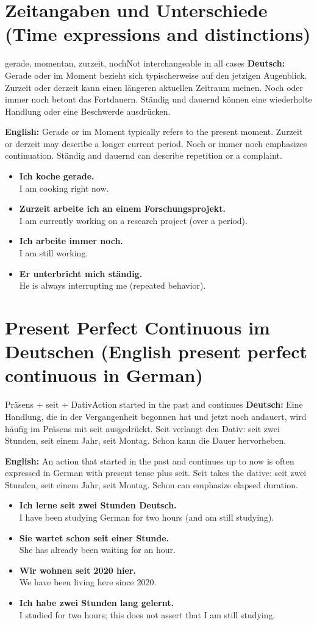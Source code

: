 \documentclass[a4paper,11pt]{article}
\newcommand{\GermanText}[1]{\textbf{Deutsch: }#1\par}
\newcommand{\EnglishText}[1]{{\small\color{SoftGray}\textbf{English: }#1\par}}
\newcommand{\ExampleItem}[2]{\item \textbf{#1}\\{\small\color{SoftGray}#2}}
\begin{document}
\section{Zeitangaben und Unterschiede \textnormal{(Time expressions and distinctions)}}
\begin{grammarentry}{gerade, momentan, zurzeit, noch}{Not interchangeable in all cases}
\GermanText{Gerade oder im Moment bezieht sich typischerweise auf den jetzigen Augenblick. Zurzeit oder derzeit kann einen längeren aktuellen Zeitraum meinen. Noch oder immer noch betont das Fortdauern. Ständig und dauernd können eine wiederholte Handlung oder eine Beschwerde ausdrücken.}
\EnglishText{Gerade or im Moment typically refers to the present moment. Zurzeit or derzeit may describe a longer current period. Noch or immer noch emphasizes continuation. Ständig and dauernd can describe repetition or a complaint.}
\end{grammarentry}
\begin{exbox}
\begin{itemize}
\ExampleItem{Ich koche gerade.}{I am cooking right now.}
\ExampleItem{Zurzeit arbeite ich an einem Forschungsprojekt.}{I am currently working on a research project (over a period).}
\ExampleItem{Ich arbeite immer noch.}{I am still working.}
\ExampleItem{Er unterbricht mich ständig.}{He is always interrupting me (repeated behavior).}
\end{itemize}
\end{exbox}

\section{Present Perfect Continuous im Deutschen \textnormal{(English present perfect continuous in German)}}
\begin{grammarentry}{Präsens + seit + Dativ}{Action started in the past and continues}
\GermanText{Eine Handlung, die in der Vergangenheit begonnen hat und jetzt noch andauert, wird häufig im Präsens mit seit ausgedrückt. Seit verlangt den Dativ: seit zwei Stunden, seit einem Jahr, seit Montag. Schon kann die Dauer hervorheben.}
\EnglishText{An action that started in the past and continues up to now is often expressed in German with present tense plus seit. Seit takes the dative: seit zwei Stunden, seit einem Jahr, seit Montag. Schon can emphasize elapsed duration.}
\end{grammarentry}
\begin{exbox}
\begin{itemize}
\ExampleItem{Ich lerne seit zwei Stunden Deutsch.}{I have been studying German for two hours (and am still studying).}
\ExampleItem{Sie wartet schon seit einer Stunde.}{She has already been waiting for an hour.}
\ExampleItem{Wir wohnen seit 2020 hier.}{We have been living here since 2020.}
\ExampleItem{Ich habe zwei Stunden lang gelernt.}{I studied for two hours; this does not assert that I am still studying.}
\end{itemize}
\end{exbox}
\end{document}
